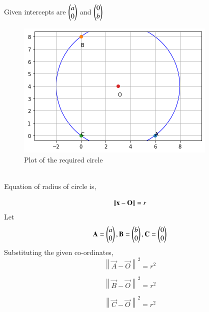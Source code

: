 \documentclass[journal,12pt,twocolumn]{IEEEtran}
\begin{document}
Given intercepts are $\begin{pmatrix}a\\0\end{pmatrix}$ and $\begin{pmatrix}0\\b\end{pmatrix}$ \\
\begin{figure}[!h]
         \centering
         \includegraphics[width=\columnwidth]{figure3.png}
         \caption{Plot of the required circle}
         \label{Figure}
\end{figure}\\
Equation of radius of circle is,

\begin{equation}
   \lVert\mathbf{x}-\mathbf{O}\rVert=r
\end{equation}
Let 
\begin{equation}
 \mathbf{A}=\begin{pmatrix}a\\0\end{pmatrix} ,\\
 \mathbf{B}=\begin{pmatrix}b\\0\end{pmatrix},\\
 \mathbf{C}=\begin{pmatrix}0\\0\end{pmatrix}
\end{equation}
Substituting the given co-ordinates,
\begin{equation}
\left\lVert {\vec{A}-\vec{O}}\right\rVert^2=r^2 \label{eq:1}
\end{equation}


 \begin{equation}
\left\lVert {\vec{B}-\vec{O}}\right\rVert^2=r^2 \label{eq:2}
\end{equation}



\begin{equation}
\left\lVert {\vec{C}-\vec{O}}\right\rVert^2=r^2 \label{eq:3}
\end{equation}
\end{document}

